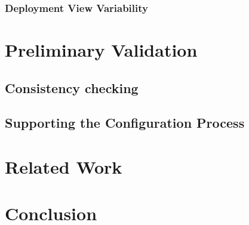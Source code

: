 \documentclass{llncs}
\begin{document}
\subsubsection{Deployment View Variability}

\section{Preliminary Validation} \label{sec4}
\subsection{Consistency checking}
\subsection{Supporting the Configuration Process}
\section{Related Work} \label{sec5}
\section{Conclusion} \label{sec6}


\end{document}
